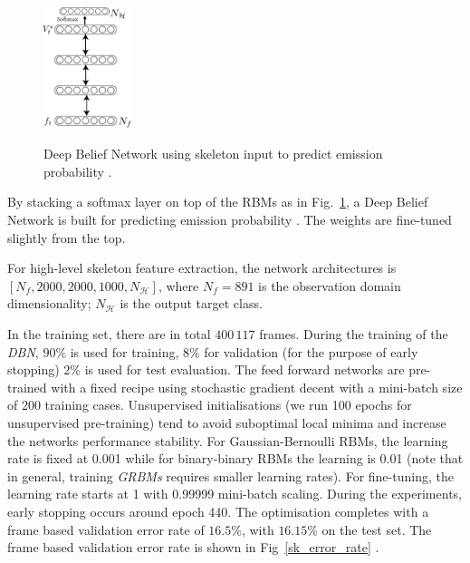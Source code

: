 \begin{figure}[t]
  \centering
  \includegraphics[width=0.23\textwidth]{images/DBN}\\
  \caption{
    Deep Belief Network using skeleton input \skfeature{} to predict emission probability \emissionprob{}.}
    \label{DBN}
\end{figure}

By stacking a softmax layer on top of the RBMs as in Fig.~\ref{DBN}, a Deep Belief Network is built for predicting emission probability \emissionprob{}. The weights are fine-tuned slightly from the top.

For high-level skeleton feature extraction, the network architectures is $[N_f,2000,2000,1000,N_{\mathcal{H}}]$,
 where $N_f = 891$ is the observation domain dimensionality; $N_{\mathcal{H}}$ is the output target class.






 In the training set, there are in total $400\,117$ frames. During the training of the \emph{DBN}, $90\%$ is used for training, $8\%$ for validation (for the purpose of early stopping) $2\%$ is used for test evaluation.
The feed forward networks are pre-trained with a fixed recipe using stochastic gradient decent with a mini-batch size of 200 training cases. Unsupervised initialisations (we run 100 epochs for unsupervised pre-training) tend to avoid suboptimal local minima and increase the networks performance stability. For Gaussian-Bernoulli RBMs, the learning rate is fixed at 0.001 while for binary-binary RBMs the learning is 0.01 (note that in general, training \emph{GRBMs} requires smaller learning rates). For fine-tuning, the learning rate starts at 1 with 0.99999 mini-batch scaling. During the experiments, early stopping occurs around epoch 440.
The optimisation completes with a frame based validation error rate of $16.5\%$, with $16.15\%$ on the test set. The frame based validation error rate is shown in Fig~\ref{sk_error_rate} .

